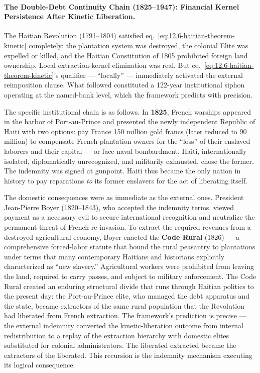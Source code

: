 \paragraph{The Double-Debt Continuity Chain (1825--1947): Financial Kernel Persistence After Kinetic Liberation.}
\label{par:double_debt_chain}

The Haitian Revolution (1791--1804) satisfied eq.~\ref{eq:12.6-haitian-theorem-kinetic} completely: the plantation system was destroyed, the colonial Elite was expelled or killed, and the Haitian Constitution of 1805 prohibited foreign land ownership. Local extraction-kernel elimination was real. But eq.~\ref{eq:12.6-haitian-theorem-kinetic}'s qualifier --- ``locally'' --- immediately activated the external reimposition clause. What followed constituted a 122-year institutional siphon operating at the named-bank level, which the framework predicts with precision.

The specific institutional chain is as follows. In \textbf{1825}, French warships appeared in the harbor of Port-au-Prince and presented the newly independent Republic of Haiti with two options: pay France 150 million gold francs (later reduced to 90 million) to compensate French plantation owners for the ``loss'' of their enslaved laborers and their capital --- or face naval bombardment. Haiti, internationally isolated, diplomatically unrecognized, and militarily exhausted, chose the former. The indemnity was signed at gunpoint. Haiti thus became the only nation in history to pay reparations \textit{to} its former enslavers for the act of liberating itself.

The domestic consequences were as immediate as the external ones. President Jean-Pierre Boyer (1820--1843), who accepted the indemnity terms, viewed payment as a necessary evil to secure international recognition and neutralize the permanent threat of French re-invasion. To extract the required revenues from a destroyed agricultural economy, Boyer enacted the \textbf{Code Rural} (1826) --- a comprehensive forced-labor statute that bound the rural peasantry to plantations under terms that many contemporary Haitians and historians explicitly characterized as ``new slavery.'' Agricultural workers were prohibited from leaving the land, required to carry passes, and subject to military enforcement. The Code Rural created an enduring structural divide that runs through Haitian politics to the present day: the Port-au-Prince elite, who managed the debt apparatus and the state, became extractors of the same rural population that the Revolution had liberated from French extraction. The framework's prediction is precise --- the external indemnity converted the kinetic-liberation outcome from internal redistribution to a replay of the extraction hierarchy with domestic elites substituted for colonial administrators. The liberated extracted became the extractors of the liberated. This recursion is the indemnity mechanism executing its logical consequence.

